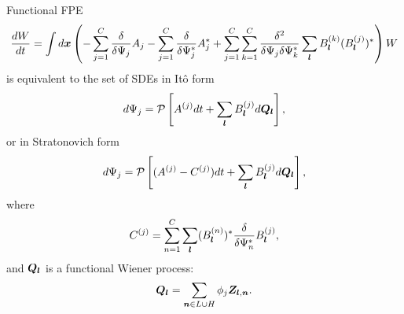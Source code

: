 \begin{theorem}
Functional FPE
\[
	\frac{dW}{dt}
	= \int d\boldsymbol{x} \left(
		- \sum_{j=1}^C \frac{\delta}{\delta \Psi_j} A_j
		- \sum_{j=1}^C \frac{\delta}{\delta \Psi_j^*} A_j^*
		+ \sum_{j=1}^C \sum_{k=1}^C \frac{\delta^2}{\delta \Psi_j \delta \Psi_k^*}
			\sum_{\boldsymbol{l}} B_{\boldsymbol{l}}^{(k)} (B_{\boldsymbol{l}}^{(j)})^*
	\right) W
\]
is equivalent to the set of SDEs in It\^{o} form
\[
	d\Psi_j = \mathcal{P} \left[
		A^{(j)} dt + \sum_{\boldsymbol{l}} B_{\boldsymbol{l}}^{(j)} d\bm{Q}_{\boldsymbol{l}}
	\right],
\]
or in Stratonovich form
\[
	d\Psi_j = \mathcal{P} \left[
		(A^{(j)} - C^{(j)}) dt + \sum_{\boldsymbol{l}} B_{\boldsymbol{l}}^{(j)} d\bm{Q}_{\boldsymbol{l}}
	\right],
\]
where
\[
	C^{(j)} = \sum_{n=1}^C \sum_{\boldsymbol{l}}
		(B_{\boldsymbol{l}}^{(n)})^*
		\frac{\delta}{\delta \Psi_n^*}
		B_{\boldsymbol{l}}^{(j)},
\]
and $\bm{Q}_{\boldsymbol{l}}$ is a functional Wiener process:
\[
	\bm{Q}_{\boldsymbol{l}} = \sum_{\boldsymbol{n} \in L \cup H} \phi_j \bm{Z}_{\boldsymbol{l},\boldsymbol{n}}.
\]
\end{theorem}
